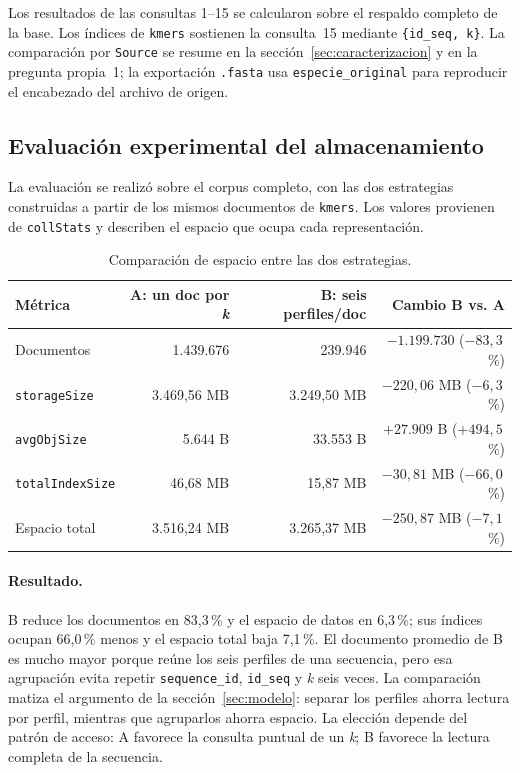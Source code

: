 \documentclass[journal]{IEEEtran}
\begin{document}
Los resultados de las consultas 1--15 se calcularon sobre el respaldo completo de la base.
Los índices de \texttt{kmers} sostienen la consulta~15 mediante \texttt{\{id\_seq, k\}}. La
comparación por \texttt{Source} se resume en la sección~\ref{sec:caracterizacion} y en la
pregunta propia~1; la exportación \texttt{.fasta} usa \texttt{especie\_original} para
reproducir el encabezado del archivo de origen.

\subsection{Evaluación experimental del almacenamiento}
\label{sec:benchmark}
La evaluación se realizó sobre el corpus completo, con las dos estrategias construidas a
partir de los mismos documentos de \texttt{kmers}. Los valores provienen de
\texttt{collStats} y describen el espacio que ocupa cada representación.

\begin{table}[!t]
\caption{Comparación de espacio entre las dos estrategias.}
\label{tab:benchmark}
\centering
\scriptsize
\setlength{\tabcolsep}{2.5pt}
\begin{tabular}{@{}lrrr@{}}
\toprule
Métrica & A: un doc por \textit{k} & B: seis perfiles/doc & Cambio B vs. A \\
\midrule
Documentos & 1.439.676 & 239.946 & $-1.199.730$ ($-83,3$\,\%) \\
\texttt{storageSize} & 3.469,56 MB & 3.249,50 MB & $-220,06$ MB ($-6,3$\,\%) \\
\texttt{avgObjSize} & 5.644 B & 33.553 B & $+27.909$ B ($+494,5$\,\%) \\
\texttt{totalIndexSize} & 46,68 MB & 15,87 MB & $-30,81$ MB ($-66,0$\,\%) \\
Espacio total & 3.516,24 MB & 3.265,37 MB & $-250,87$ MB ($-7,1$\,\%) \\
\bottomrule
\end{tabular}
\end{table}

\paragraph*{Resultado.}
B reduce los documentos en 83,3\,\% y el espacio de datos en 6,3\,\%; sus índices ocupan
66,0\,\% menos y el espacio total baja 7,1\,\%. El documento promedio de B es mucho mayor
porque reúne los seis perfiles de una secuencia, pero esa agrupación evita repetir
\texttt{sequence\_id}, \texttt{id\_seq} y \textit{k} seis veces. La comparación matiza el
argumento de la sección~\ref{sec:modelo}: separar los perfiles ahorra lectura por perfil,
mientras que agruparlos ahorra espacio. La elección depende del patrón de acceso: A
favorece la consulta puntual de un \textit{k}; B favorece la lectura completa de la
secuencia.
\end{document}
